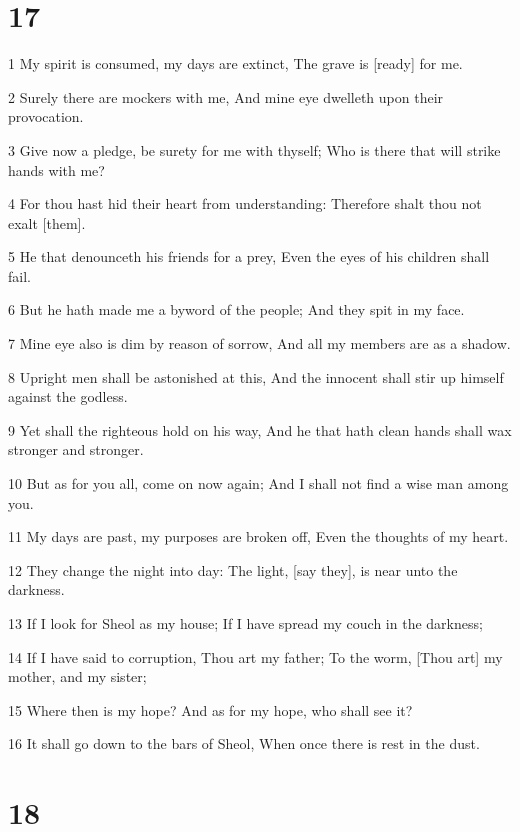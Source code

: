 \chapter{17}

\par 1 My spirit is consumed, my days are extinct, The grave is [ready] for me.
\par 2 Surely there are mockers with me, And mine eye dwelleth upon their provocation.
\par 3 Give now a pledge, be surety for me with thyself; Who is there that will strike hands with me?
\par 4 For thou hast hid their heart from understanding: Therefore shalt thou not exalt [them].
\par 5 He that denounceth his friends for a prey, Even the eyes of his children shall fail.
\par 6 But he hath made me a byword of the people; And they spit in my face.
\par 7 Mine eye also is dim by reason of sorrow, And all my members are as a shadow.
\par 8 Upright men shall be astonished at this, And the innocent shall stir up himself against the godless.
\par 9 Yet shall the righteous hold on his way, And he that hath clean hands shall wax stronger and stronger.
\par 10 But as for you all, come on now again; And I shall not find a wise man among you.
\par 11 My days are past, my purposes are broken off, Even the thoughts of my heart.
\par 12 They change the night into day: The light, [say they], is near unto the darkness.
\par 13 If I look for Sheol as my house; If I have spread my couch in the darkness;
\par 14 If I have said to corruption, Thou art my father; To the worm, [Thou art] my mother, and my sister;
\par 15 Where then is my hope? And as for my hope, who shall see it?
\par 16 It shall go down to the bars of Sheol, When once there is rest in the dust.

\chapter{18}

